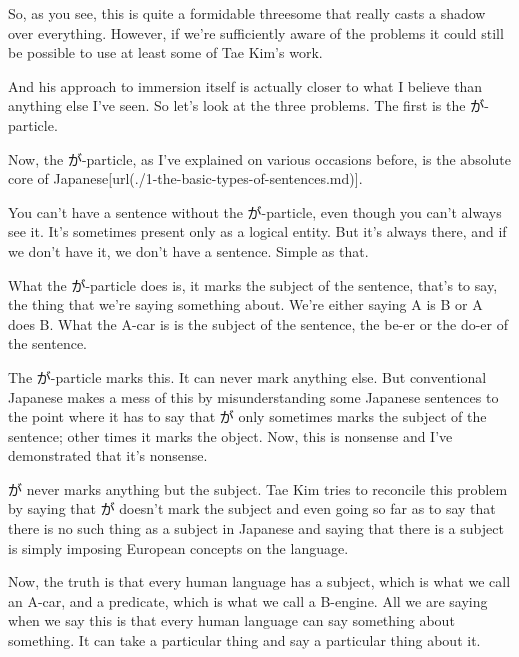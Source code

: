 {}

So, as you see, this is quite a formidable threesome that really casts a shadow over everything. However, if we're sufficiently aware of the problems it could still be possible to use at least some of Tae Kim's work.

And his approach to immersion itself is actually closer to what I believe than anything else I've seen. So let's look at the three problems. The first is the が-particle.

\stopsectionlevel

\startsectionlevel[title={The が Particle},reference={the-が-particle}]

Now, the が-particle, as I've explained on various occasions before, is the absolute core of Japanese\goto{{[}1{]}}[url(./1-the-basic-types-of-sentences.md)].

{}

You can't have a sentence without the が-particle, even though you can't always see it. It's sometimes present only as a logical entity. But it's always there, and if we don't have it, we don't have a sentence. Simple as that.

\thinrule

What the が-particle does is, it marks the subject of the sentence, that's to say, the thing that we're saying something about. We're either saying A is B or A does B. What the A-car is is the subject of the sentence, the be-er or the do-er of the sentence.

The が-particle marks this. It can never mark anything else. But conventional Japanese makes a mess of this by misunderstanding some Japanese sentences to the point where it has to say that が only sometimes marks the subject of the sentence; other times it marks the object.\crlf
Now, this is nonsense and I've demonstrated that it's nonsense.

が never marks anything but the subject. Tae Kim tries to reconcile this problem by saying that が doesn't mark the subject and even going so far as to say that there is no such thing as a subject in Japanese and saying that there is a subject is simply imposing European concepts on the language.

{}

Now, the truth is that every human language has a subject, which is what we call an A-car, and a predicate, which is what we call a B-engine. All we are saying when we say this is that every human language can say something about something. It can take a particular thing and say a particular thing about it.

